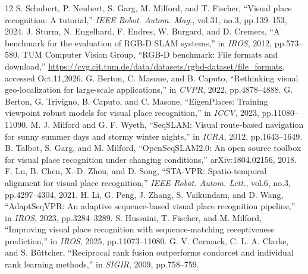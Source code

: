 \documentclass[conference,letterpaper]{IEEEtran}
\begin{document}
\begin{thebibliography}{12}
 S. Schubert, P. Neubert, S. Garg, M. Milford, and T. Fischer, ``Visual place recognition: A tutorial,'' \emph{IEEE Robot. Autom. Mag.}, vol.31, no.3, pp.139--153, 2024.
 J. Sturm, N. Engelhard, F. Endres, W. Burgard, and D. Cremers, ``A benchmark for the evaluation of RGB-D SLAM systems,'' in \emph{IROS}, 2012, pp.573--580.
 TUM Computer Vision Group, ``RGB-D benchmark: File formats and download,'' \url{https://cvg.cit.tum.de/data/datasets/rgbd-dataset/file_formats}, accessed Oct.11,2026.
 G. Berton, C. Masone, and B. Caputo, ``Rethinking visual geo-localization for large-scale applications,'' in \emph{CVPR}, 2022, pp.4878--4888.
 G. Berton, G. Trivigno, B. Caputo, and C. Masone, ``EigenPlaces: Training viewpoint robust models for visual place recognition,'' in \emph{ICCV}, 2023, pp.11080--11090.
 M. J. Milford and G. F. Wyeth, ``SeqSLAM: Visual route-based navigation for sunny summer days and stormy winter nights,'' in \emph{ICRA}, 2012, pp.1643--1649.
 B. Talbot, S. Garg, and M. Milford, ``OpenSeqSLAM2.0: An open source toolbox for visual place recognition under changing conditions,'' arXiv:1804.02156, 2018.
 F. Lu, B. Chen, X.-D. Zhou, and D. Song, ``STA-VPR: Spatio-temporal alignment for visual place recognition,'' \emph{IEEE Robot. Autom. Lett.}, vol.6, no.3, pp.4297--4304, 2021.
 H. Li, G. Peng, J. Zhang, S. Vaikundam, and D. Wang, ``AdaptSeqVPR: An adaptive sequence-based visual place recognition pipeline,'' in \emph{IROS}, 2023, pp.3284--3289.
 S. Hussaini, T. Fischer, and M. Milford, ``Improving visual place recognition with sequence-matching receptiveness prediction,'' in \emph{IROS}, 2025, pp.11073--11080.
 G. V. Cormack, C. L. A. Clarke, and S. B\"uttcher, ``Reciprocal rank fusion outperforms condorcet and individual rank learning methods,'' in \emph{SIGIR}, 2009, pp.758--759.
\end{thebibliography}
\end{document}
